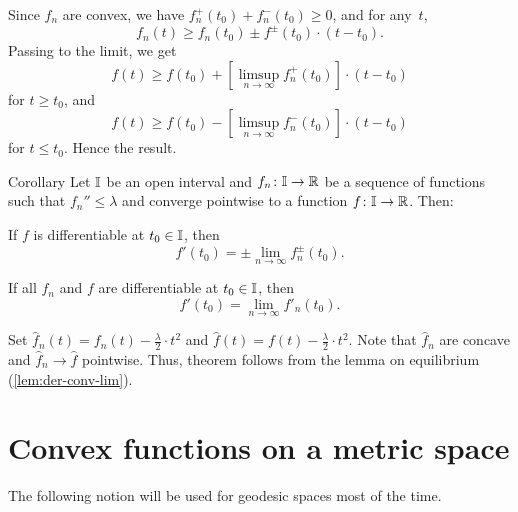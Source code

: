 Since $f_n$ are convex, we have $f^+_n(t_0)+f^-_n(t_0)\ge0$, and for any~$t$,
\[f_n(t)\ge f_n(t_0)\pm f^\pm(t_0)\cdot (t-t_0).\]
Passing to the limit, we get
\[f(t)\ge f(t_0)+\left[\limsup_{n\to\infty}f^+_n(t_0)\right]\cdot (t-t_0)\]
for $t\ge t_0$, and 
\[f(t)\ge f(t_0)-\left[\limsup_{n\to\infty}f^-_n(t_0)\right]\cdot (t-t_0)\]
for $t\le t_0$.
Hence the result.
\qeds

\begin{thm}{Corollary}
\label{cor:der-conv-lim}
Let $\mathbb{I}$ be an open interval 
and $f_n\:\II\to\RR$ be a sequence of functions such that $f_n''\le \lambda$ and converge pointwise to a function $f\:\II\to\RR$.
Then: 
\begin{subthm}{} If $f$ is differentiable at $t_0\in \II$, then
\[f'(t_0)=\pm\lim_{n\to\infty} f^\pm_n(t_0).\]
\end{subthm}

\begin{subthm}{} If all $f_n$ and $f$ are differentiable at $t_0\in \II$, then
\[f'(t_0)=\lim_{n\to\infty} f'_n(t_0).\]
\end{subthm}
\end{thm}

 Set $\hat f_n(t)=f_n(t)-\tfrac{\lambda}{2}\cdot t^2$ and $\hat f(t)=f(t)-\tfrac\lambda2\cdot t^2$.
Note that $\hat f_n$ are concave and $\hat f_n\to \hat f$ pointwise.
Thus, theorem follows from the lemma on equilibrium (\ref{lem:der-conv-lim}).\qeds











\section{Convex functions on a metric space}\label{sec:conv-fun}

The following notion will be used for geodesic spaces most of the time.

